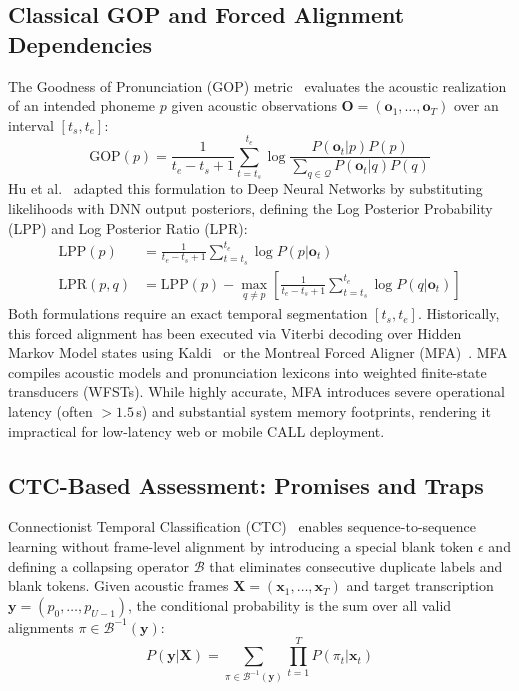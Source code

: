 \documentclass[10pt,conference]{IEEEtran}
\begin{document}
\subsection{Classical GOP and Forced Alignment Dependencies}
The Goodness of Pronunciation (GOP) metric~\cite{witt2000phone} evaluates the acoustic realization of an intended phoneme $p$ given acoustic observations $\mathbf{O} = (\mathbf{o}_1, \dots, \mathbf{o}_T)$ over an interval $[t_s, t_e]$:
\begin{equation}
\text{GOP}(p) = \frac{1}{t_e - t_s + 1} \sum_{t=t_s}^{t_e} \log \frac{P(\mathbf{o}_t | p) P(p)}{\sum_{q \in \mathcal{Q}} P(\mathbf{o}_t | q) P(q)}
\label{eq:classical_gop}
\end{equation}
Hu et al.~\cite{hu2015improved} adapted this formulation to Deep Neural Networks by substituting likelihoods with DNN output posteriors, defining the Log Posterior Probability (LPP) and Log Posterior Ratio (LPR):
\begin{align}
\text{LPP}(p) &= \frac{1}{t_e - t_s + 1} \sum_{t=t_s}^{t_e} \log P(p | \mathbf{o}_t) \label{eq:lpp_hard} \\
\text{LPR}(p, q) &= \text{LPP}(p) - \max_{q \neq p} \left[ \frac{1}{t_e - t_s + 1} \sum_{t=t_s}^{t_e} \log P(q | \mathbf{o}_t) \right]
\label{eq:lpr_hard}
\end{align}
Both formulations require an exact temporal segmentation $[t_s, t_e]$. Historically, this forced alignment has been executed via Viterbi decoding over Hidden Markov Model states using Kaldi~\cite{povey2011kaldi} or the Montreal Forced Aligner (MFA)~\cite{mcauliffe2017montreal}. MFA compiles acoustic models and pronunciation lexicons into weighted finite-state transducers (WFSTs). While highly accurate, MFA introduces severe operational latency (often $>1.5$\,s) and substantial system memory footprints, rendering it impractical for low-latency web or mobile CALL deployment.

\subsection{CTC-Based Assessment: Promises and Traps}
Connectionist Temporal Classification (CTC)~\cite{graves2006connectionist} enables sequence-to-sequence learning without frame-level alignment by introducing a special blank token $\epsilon$ and defining a collapsing operator $\mathcal{B}$ that eliminates consecutive duplicate labels and blank tokens. Given acoustic frames $\mathbf{X} = (\mathbf{x}_1, \dots, \mathbf{x}_T)$ and target transcription $\mathbf{y} = (p_0, \dots, p_{U-1})$, the conditional probability is the sum over all valid alignments $\pi \in \mathcal{B}^{-1}(\mathbf{y})$:
\begin{equation}
P(\mathbf{y} | \mathbf{X}) = \sum_{\pi \in \mathcal{B}^{-1}(\mathbf{y})} \prod_{t=1}^T P(\pi_t | \mathbf{x}_t)
\label{eq:ctc_prob}
\end{equation}
\end{document}

